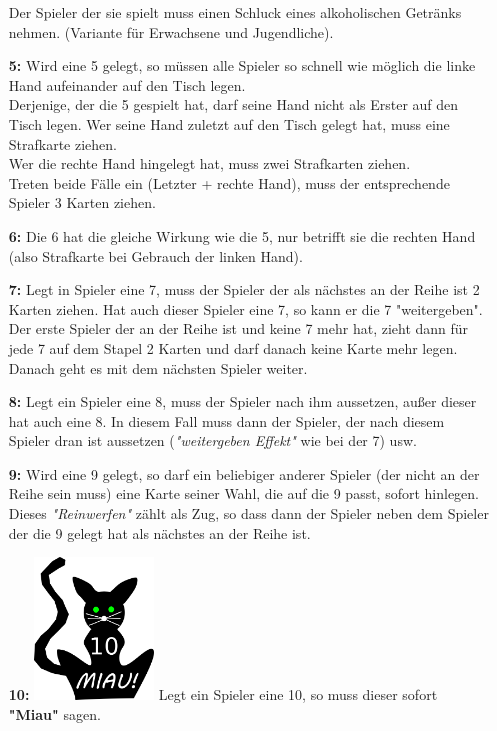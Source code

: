 \documentclass{article}
\begin{document}
\begin{itemize}
Der Spieler der sie spielt muss einen Schluck eines alkoholischen Getränks nehmen. (Variante für Erwachsene und Jugendliche).
\item[\textbf{5:}]
Wird eine 5 gelegt, so müssen alle Spieler so schnell wie möglich die linke Hand aufeinander auf den Tisch legen. \\
Derjenige, der die 5 gespielt hat, darf seine Hand nicht als Erster auf den Tisch legen. Wer seine Hand zuletzt auf den Tisch gelegt hat, muss eine Strafkarte ziehen. \\
Wer die rechte Hand hingelegt hat, muss zwei Strafkarten ziehen.\\ Treten beide Fälle ein (Letzter + rechte Hand), muss der entsprechende Spieler 3 Karten ziehen.
\item[\textbf{6:}]
Die 6 hat die gleiche Wirkung wie die 5, nur betrifft sie die rechten Hand (also Strafkarte bei Gebrauch der linken Hand).
\item[\textbf{7:}] 
Legt in Spieler eine 7, muss der Spieler der als nächstes an der Reihe ist 2 Karten ziehen. Hat auch dieser Spieler eine 7, so kann er die 7 "weitergeben". Der erste Spieler der an der Reihe ist und keine 7 mehr hat, zieht dann für jede 7 auf dem Stapel 2 Karten und darf danach keine Karte mehr legen. \\
Danach geht es mit dem nächsten Spieler weiter.
\item[\textbf{8:}]
Legt ein Spieler eine 8, muss der Spieler nach ihm aussetzen, außer dieser hat auch eine 8. In diesem Fall muss dann der Spieler, der nach diesem Spieler dran ist aussetzen (\textit{"weitergeben
Effekt"} wie bei der 7) usw.
\item[\textbf{9:}]
Wird eine 9 gelegt, so darf ein beliebiger anderer Spieler (der nicht an der Reihe sein muss) eine Karte seiner Wahl, die auf die 9 passt, sofort hinlegen. Dieses
\textit{"Reinwerfen"} zählt als Zug, so dass dann der Spieler neben dem Spieler der die 9 gelegt hat als nächstes an der Reihe ist.
\item[\textbf{10:}]
\includegraphics[width=0.25\textwidth]{photos/Katze.png}
Legt ein Spieler eine 10, so muss dieser sofort \textbf{"Miau"} sagen. \\

\end{itemize}
\end{document}
